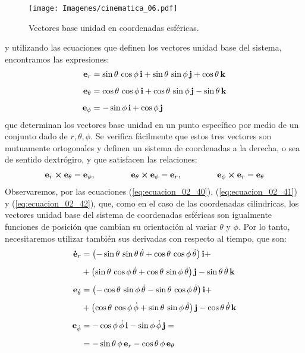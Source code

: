 \begin{figure}[H]
    \centering
    \texttt{[image: Imagenes/cinematica\_06.pdf]}
    \caption{Vectores base unidad en coordenadas esféricas.}
    \label{fig:figura_02_06}
\end{figure}
y utilizando las ecuaciones que definen los vectores unidad base del sistema, encontramos las expresiones:
\begin{align}
    \vb{e}_{r} &= \sin \theta \, \cos \phi \, \vb{i} + \sin \theta \, \sin \phi \, \vb{j} + \cos \theta \, \vb{k} \label{eq:ecuacion_02_40} \\[0.5em]
    \vb{e}_{\theta} &= \cos \theta \, \cos \phi \, \vb{i} + \cos \theta \, \sin \phi \, \vb{j} - \sin \theta \, \vb{k} \label{eq:ecuacion_02_41} \\[0.5em]
    \vb{e}_{\phi} &= - \sin \phi \, \vb{i} + \cos \phi \, \vb{j} \label{eq:ecuacion_02_42}
\end{align}
que determinan los vectores base unidad en un punto específico por medio de un conjunto dado de $r, \theta, \phi$. Se verifica fácilmente que estos tres vectores son mutuamente ortogonales y definen un sistema de coordenadas a la derecha, o sea de sentido dextrógiro, y que satisfacen las relaciones:
\begin{align}
    \vb{e}_{r} \cp \vb{e}_{\theta} = \vb{e}_{\phi}, \hspace{1.5cm} \vb{e}_{\theta} \cp \vb{e}_{\phi} = \vb{e}_{r}, \hspace{1.5cm} \vb{e}_{\phi} \cp \vb{e}_{r} = \vb{e}_{\theta} \label{eq:ecuacion_02_43}
\end{align}
Observaremos, por las ecuaciones (\ref{eq:ecuacion_02_40}), (\ref{eq:ecuacion_02_41}) y (\ref{eq:ecuacion_02_42}), que, como en el caso de las coordenadas cilindricas, los vectores unidad base del sistema de coordenadas esféricas son igualmente funciones de posición que cambian su orientación al variar $\theta$ y $\phi$. Por lo tanto, necesitaremos utilizar también sus derivadas con respecto al tiempo, que son: 
\begin{align}
    \vb{\dot{e}}_{r} &= \left( - \sin \theta \, \sin \theta \, \dot{\theta} + \cos \theta \, \cos \phi \, \dot{\theta} \right) \vb{i} + \nonumber \\[0.5em] 
    &+ \left( \sin \theta \, \cos \phi \, \dot{\theta} + \cos \theta \, \sin \phi \, \dot{\theta} \right) \vb{j} - \sin \theta \, \dot{\theta} \, \vb{k} \label{eq:ecuacion_02_44} \\[0.5em]
    \vb{e}_{\dot{\theta}} &= \left( - \cos \theta \, \sin \phi \, \dot{\theta} - \sin \theta \, \cos \phi \, \dot{\theta} \right) \vb{i} + \nonumber \\[0.5em]
    &+ \left( \cos \theta \, \cos \phi \, \dot{\phi} + \sin \theta \, \sin \phi \, \dot{\theta} \right) \vb{j} - \cos \theta \, \dot{\theta} \, \vb{k} \label{eq:ecuacion_02_45} \\[0.5em]
    \vb{e}_{\dot{\phi}} &= - \cos \phi \, \dot{\phi} \, \vb{i} - \sin \phi \, \dot{\phi} \, \vb{j} = \nonumber \\[0.5em]
    &= - \sin \theta \, \phi \, \vb{e}_{r} - \cos \theta \, \phi \, \vb{e}_{\theta} \label{eq:ecuacion_02_46}
\end{align}
